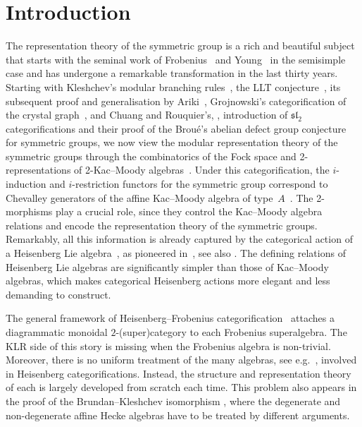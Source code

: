 \documentclass[a4paper,11pt]{amsart}
\numberwithin{equation}{subsection}
\theoremstyle{definition}
\theoremstyle{theorem}
\theoremstyle{remark}
\begin{document}
\section*{Introduction}
The representation theory of the symmetric group is a rich and beautiful
subject that starts with the seminal work of
Frobenius~\cite{Frobenius:symmetric} and Young~\cite{QSAI} in the
semisimple case and has undergone a remarkable transformation in the last
thirty years. Starting with Kleshchev's modular branching
rules~\cite{Klesh:I}, the LLT conjecture~\cite{LLT}, its
subsequent proof and generalisation by Ariki~\cite{Ariki:can},
Grojnowski's categorification of the crystal graph~\cite{Groj:control},
and Chuang and Rouquier's, \cite{ChuangRouq:sl2}, introduction of $\mathfrak{sl}_2$
categorifications and their proof of the Brou\'e's abelian defect group
conjecture for symmetric groups, we now view the modular representation
theory of the symmetric groups through the combinatorics of the Fock
space and 2-representations of 2-Kac--Moody
algebras~\cite{KhovLaud:diagIII,Rouq:2KM,BK:GradedKL}. Under this
categorification, the $i$-induction and $i$-restriction functors for the
symmetric group correspond to Chevalley generators of the affine
Kac--Moody algebra of type~$A$~\cite{Ariki:can,BK:GradedDecomp}. The
2-morphisms play a crucial role, since they control the Kac--Moody
algebra relations and encode the representation theory of the symmetric
groups. Remarkably, all this information is already captured by the
categorical action of a Heisenberg Lie
algebra~\cite{Brundan:Heisenberg}, as pioneered
in~\cite{Khovanov:Heisenberg}, see also \cite{LicataSavage:Heisenberg, LicataSavage:Hecke,
CautisLicata:Heisenberg, LicataSavage:Survey}.
The defining relations of Heisenberg Lie algebras are significantly
simpler than those of Kac--Moody algebras, which makes categorical
Heisenberg actions more elegant and less demanding to construct.

The general framework of Heisenberg--Frobenius
categorification~\cite{CautisLicata:Heisenberg,BSWHeis,LicataSavage:Heisenberg,
BrundanSavageWebster:QuantumHeisenberg,
BrundanSavageWebster:FoundationsHeisenberg} attaches a diagrammatic
monoidal $2$-(super)category to each Frobenius superalgebra. The KLR
side of this story is missing when the Frobenius algebra is non-trivial.
Moreover, there is no uniform treatment of the many algebras, see
e.g.~\cite{RossoSavage:QuantumAffineWreath,Savage:AffineWreath,wreathHecke,WanWang,CT:wreath,Pushkarev}, involved in Heisenberg categorifications. Instead, the structure and
representation theory of each is largely developed from scratch each time. This problem also appears in the proof of the Brundan--Kleshchev isomorphism \cite{BK:GradedKL}, where the degenerate and non-degenerate affine Hecke algebras have to be treated by different arguments.
\end{document}

